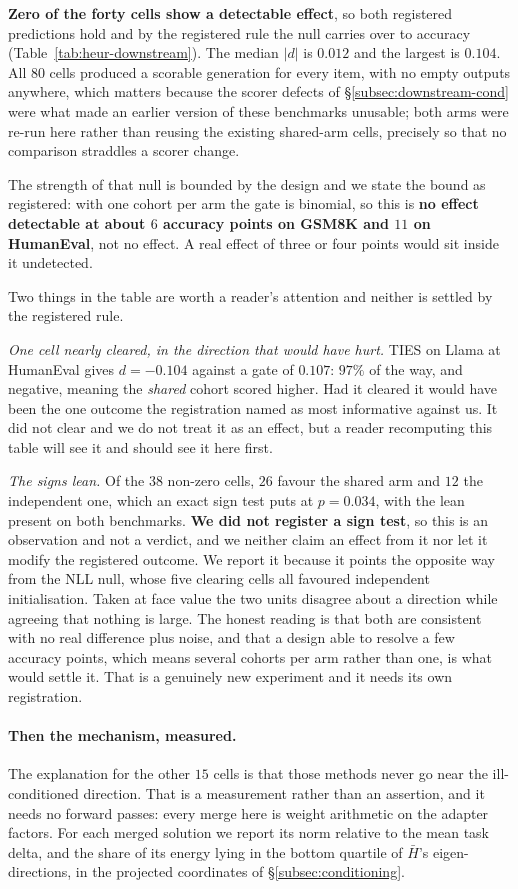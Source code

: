 \textbf{Zero of the forty cells show a detectable effect}, so both registered
predictions hold and by the registered rule the null carries over to accuracy
(Table~\ref{tab:heur-downstream}). The median $|d|$ is $0.012$ and the largest
is $0.104$. All $80$ cells produced a scorable generation for every item, with
no empty outputs anywhere, which matters because the scorer defects of
\S\ref{subsec:downstream-cond} were what made an earlier version of these
benchmarks unusable; both arms were re-run here rather than reusing the
existing shared-arm cells, precisely so that no comparison straddles a scorer
change.

The strength of that null is bounded by the design and we state the bound as
registered: with one cohort per arm the gate is binomial, so this is
\textbf{no effect detectable at about $6$ accuracy points on GSM8K and $11$ on
HumanEval}, not no effect. A real effect of three or four points would sit
inside it undetected.

Two things in the table are worth a reader's attention and neither is settled
by the registered rule.

\emph{One cell nearly cleared, in the direction that would have hurt.} TIES on
Llama at HumanEval gives $d = -0.104$ against a gate of $0.107$: $97\%$ of the
way, and negative, meaning the \emph{shared} cohort scored higher. Had it
cleared it would have been the one outcome the registration named as most
informative against us. It did not clear and we do not treat it as an effect,
but a reader recomputing this table will see it and should see it here first.

\emph{The signs lean.} Of the $38$ non-zero cells, $26$ favour the shared arm
and $12$ the independent one, which an exact sign test puts at $p = 0.034$,
with the lean present on both benchmarks. \textbf{We did not register a sign
test}, so this is an observation and not a verdict, and we neither claim an
effect from it nor let it modify the registered outcome. We report it because
it points the opposite way from the NLL null, whose five clearing cells all
favoured independent initialisation. Taken at face value the two units
disagree about a direction while agreeing that nothing is large. The honest
reading is that both are consistent with no real difference plus noise, and
that a design able to resolve a few accuracy points, which means several
cohorts per arm rather than one, is what would settle it. That is a genuinely
new experiment and it needs its own registration.

\paragraph{Then the mechanism, measured.} The explanation for the other
$15$ cells is that those methods never go near the ill-conditioned
direction. That is a measurement rather than an assertion, and it needs no
forward passes: every merge here is weight
arithmetic on the adapter factors. For each merged solution we report its
norm relative to the mean task delta, and the share of its energy lying in
the bottom quartile of $\bar H$'s eigen-directions, in the projected
coordinates of \S\ref{subsec:conditioning}.

